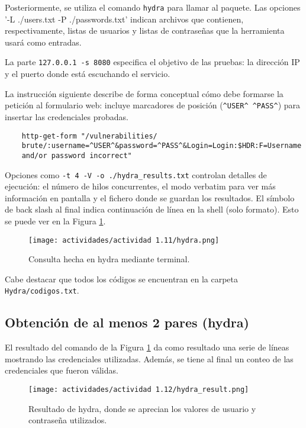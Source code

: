 \documentclass[letter,12pt]{article}
\begin{document}
Posteriormente, se utiliza el comando \verb|hydra| para llamar al paquete. Las opciones '-L ./users.txt -P ./passwords.txt' indican archivos que contienen, respectivamente, listas de usuarios y listas de contraseñas que la herramienta usará como entradas.

La parte \verb|127.0.0.1 -s 8080| especifica el objetivo de las pruebas: la dirección IP y el puerto donde está escuchando el servicio.

La instrucción siguiente describe de forma conceptual cómo debe formarse la petición al formulario web: incluye marcadores de posición (\verb|^USER^ ^PASS^|) para insertar las credenciales probadas.

\begin{verbatim}
    http-get-form "/vulnerabilities/
    brute/:username=^USER^&password=^PASS^&Login=Login:$HDR:F=Username
    and/or password incorrect"
\end{verbatim}

Opciones como \verb|-t 4 -V -o ./hydra_results.txt| controlan detalles de ejecución: el número de hilos concurrentes, el modo verbatim para ver más información en pantalla y el fichero donde se guardan los resultados. El símbolo de back slash al final indica continuación de línea en la shell (solo formato). Esto se puede ver en la Figura \ref{actividad 1.11 hydra}.

\begin{figure}[H]
    \centering
    \texttt{[image: actividades/actividad 1.11/hydra.png]}
    \caption{Consulta hecha en hydra mediante terminal.}
    \label{actividad 1.11 hydra}
\end{figure}

Cabe destacar que todos los códigos se encuentran en la carpeta \verb|Hydra/codigos.txt|.

\subsection{Obtención de al menos 2 pares (hydra)}
El resultado del comando de la Figura \ref{actividad 1.11 hydra} da como resultado una serie de líneas mostrando las credenciales utilizadas. Además, se tiene al final un conteo de las credenciales que fueron válidas.

\begin{figure}[H]
    \centering
    \texttt{[image: actividades/actividad 1.12/hydra\_result.png]}
    \caption{Resultado de hydra, donde se aprecian los valores de usuario y contraseña utilizados.}
    \label{actividad 1.12 hydra_result}
\end{figure}
\end{document}

